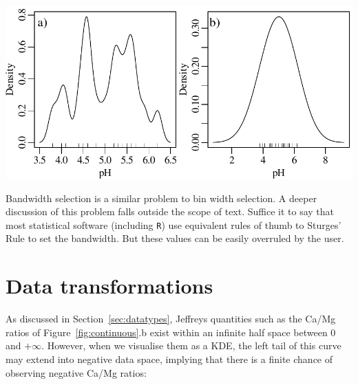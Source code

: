 \noindent\begin{minipage}[t][][b]{.6\textwidth}
  \includegraphics[width=\textwidth]{../figures/bandwidth.pdf}\medskip
\end{minipage}
\begin{minipage}[t][][t]{.4\textwidth}
\end{minipage}

Bandwidth selection is a similar problem to bin width selection.  A
deeper discussion of this problem falls outside the scope of text.
Suffice it to say that most statistical software (including
\texttt{R}) use equivalent rules of thumb to Sturges' Rule to set the
bandwidth.  But these values can be easily overruled by the user.

\section{Data transformations}
\label{sec:transformations}

As discussed in Section~\ref{sec:datatypes}, Jeffreys quantities such
as the Ca/Mg ratios of Figure~\ref{fig:continuous}.b exist within an
infinite half space between 0 and $+\infty$. However, when we
visualise them as a KDE, the left tail of this curve may extend into
negative data space, implying that there is a finite chance of
observing negative Ca/Mg ratios:

